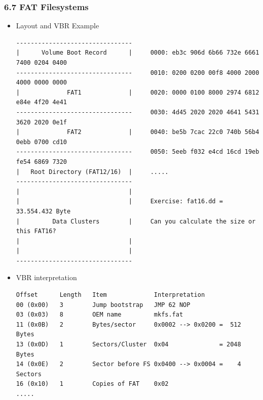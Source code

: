 \begin{frame}[fragile]
  \frametitle{6.7 FAT Filesystems}
    \begin{itemize}
	    \item Layout and VBR Example
  \begin{lstlisting}[basicstyle=\tiny]
--------------------------------
|      Volume Boot Record      |     0000: eb3c 906d 6b66 732e 6661 7400 0204 0400
--------------------------------     0010: 0200 0200 00f8 4000 2000 4000 0000 0000
|             FAT1             |     0020: 0000 0100 8000 2974 6812 e84e 4f20 4e41
--------------------------------     0030: 4d45 2020 2020 4641 5431 3620 2020 0e1f
|             FAT2             |     0040: be5b 7cac 22c0 740b 56b4 0ebb 0700 cd10
--------------------------------     0050: 5eeb f032 e4cd 16cd 19eb fe54 6869 7320
|   Root Directory (FAT12/16)  |     .....
--------------------------------
|                              |
|                              |     Exercise: fat16.dd = 33.554.432 Byte
|         Data Clusters        |     Can you calculate the size or this FAT16?
|                              |
|                              | 
--------------------------------
  \end{lstlisting}
	    \item VBR interpretation
  \begin{lstlisting}[basicstyle=\tiny]
Offset      Length   Item             Interpretation
00 (0x00)   3        Jump bootstrap   JMP 62 NOP
03 (0x03)   8        OEM name         mkfs.fat
11 (0x0B)   2        Bytes/sector     0x0002 --> 0x0200 =  512 Bytes
13 (0x0D)   1        Sectors/Cluster  0x04              = 2048 Bytes
14 (0x0E)   2        Sector before FS 0x0400 --> 0x0004 =    4 Sectors
16 (0x10)   1        Copies of FAT    0x02
.....
  \end{lstlisting}
    \end{itemize}
\end{frame}


